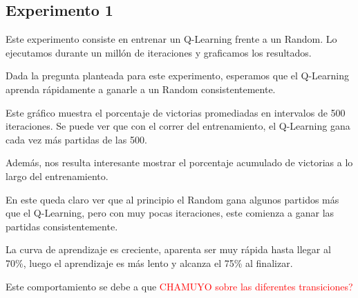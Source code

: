 \subsection{Experimento 1}

Este experimento consiste en entrenar un Q-Learning frente a un Random. Lo ejecutamos durante un mill\'on de iteraciones y graficamos los resultados.

Dada la pregunta planteada para este experimento, esperamos que el Q-Learning aprenda r\'apidamente a ganarle a un Random consistentemente.

Este gr\'afico muestra el porcentaje de victorias promediadas en intervalos de 500 iteraciones. Se puede ver que con el correr del entrenamiento, el Q-Learning gana cada vez m\'as partidas de las 500.


Adem\'as, nos resulta interesante mostrar el porcentaje acumulado de victorias a lo largo del entrenamiento.


En este queda claro ver que al principio el Random gana algunos partidos m\'as que el Q-Learning, pero con muy pocas iteraciones, este comienza a ganar las partidas consistentemente.

La curva de aprendizaje es creciente, aparenta ser muy r\'apida hasta llegar al 70\%, luego el aprendizaje es m\'as lento y alcanza el 75\% al finalizar.

Este comportamiento se debe a que \textcolor{red}{CHAMUYO sobre las diferentes transiciones?}
